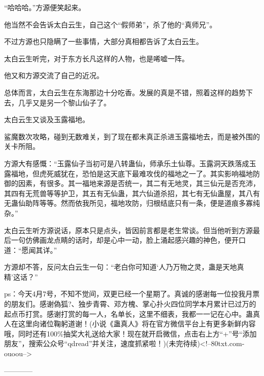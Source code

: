 \begin{this_body}
“哈哈哈。”方源便笑起来。

他当然不会告诉太白云生，自己这个“假师弟”，杀了他的“真师兄”。

不过方源也只隐瞒了一些事情，大部分真相都告诉了太白云生。

太白云生听完，对于东方长凡这样的人物，也是唏嘘一阵。

他又和方源交流了自己的近况。

总体而言，太白云生在东海那边十分吃香。发展的真是不错，照着这样的趋势下去，几乎又是另一个黎山仙子了。

太白云生又谈及玉露福地。

鲨魔数次攻略，碰到无数难关，到了现在都未真正杀进玉露福地去，而是被外围的关卡所阻。

方源大有感慨：“玉露仙子当初可是八转蛊仙，师承乐土仙尊。玉露洞天跌落成玉露福地，但虎死威犹在，恐怕是这天底下最难攻伐的福地之一了。其实影响福地防御的因素，有很多。其一福地来源是否统一，其二有无地灵，其三仙元是否充沛，其四有无荒兽等等护卫，其五有无仙蛊，其六仙道杀招，其七有无仙蛊屋，其八有无蛊仙助阵等等。然而依我所见，福地攻防，归根结底只有一条，便是道痕多寡纯杂。”

太白云生听方源说话，原本只是点头，皆因前言都是老生常谈。但当他听到方源最后一句仿佛画龙点睛的话时，却是心中一动，脸上涌起感兴趣的神色，便开口道：“愿闻其详。”

方源却不答，反问太白云生一句：“老白你可知道‘人乃万物之灵，蛊是天地真精’这话？”

ps：今天4月7号，不知不觉间，双更已经一个星期了。真诚的感谢每一位投我月票的朋友们。感谢偽狐?、独步青霄、邓方槐、掌心扑火四位同学本月累计已过万的起点币打赏。感谢打赏的每一人，名单长，这里不细表，我都一一记在心中。蛊真人在这里向诸位鞠躬道谢！(小说《蛊真人》将在官方微信平台上有更多新鲜内容哦，同时还有100\%抽奖大礼送给大家！现在就开启微信，点击右上方“+”号“添加朋友”，搜索公众号“qdread”并关注，速度抓紧啦！)(未完待续)<!--80txt.com-ouoou-->

------------

\end{this_body}

